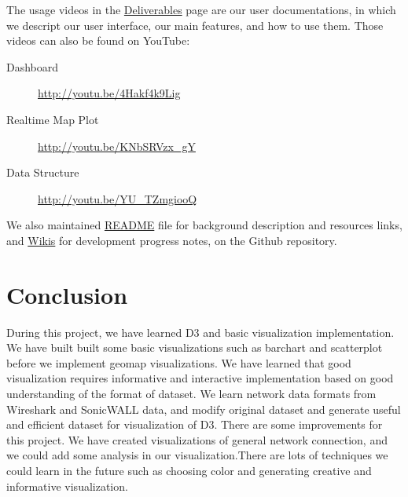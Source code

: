 \documentclass[paper=a4, fontsize=11pt]{report} %
\begin{document}
The usage videos in the \href{http://sjengle.cs.usfca.edu/cs690-sonicwall/deliverables.html}{Deliverables} page are our user documentations, in which we descript our user interface, our main features, and how to use them.
Those videos can also be found on YouTube:

\begin{description}
    \item[Dashboard] \url{http://youtu.be/4Hakf4k9Lig}
    \item[Realtime Map Plot] \url{http://youtu.be/KNbSRVzx_gY}
    \item[Data Structure] \url{http://youtu.be/YU_TZmgiooQ}
\end{description}

We also maintained \href{https://github.com/sjengle/cs690-sonicwall}{README} file for background description and resources links, and \href{https://github.com/sjengle/cs690-sonicwall/wiki}{Wikis} for development progress notes, on the Github repository.




\chapter{Conclusion} %
\label{cha:conclusion}

During this project, we have learned D3 and basic visualization implementation. We have built
built some basic visualizations such as barchart and scatterplot before we implement geomap
visualizations. We have learned that good visualization
requires informative and interactive implementation based on good understanding of the format of
dataset. We learn network data formats from Wireshark
and SonicWALL data, and modify original dataset and generate useful and efficient dataset for
visualization of D3. There are some improvements for this project. We have created visualizations of
general network connection, and we could add some analysis in our visualization.There are lots of
techniques we could learn in the future such as choosing color and generating creative and informative
visualization.




\end{document}
